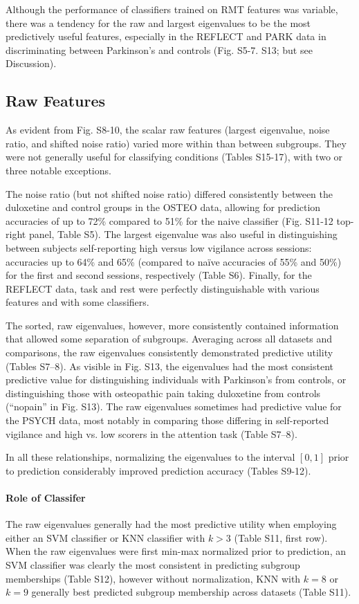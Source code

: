 \documentclass[NETN,manuscript]{stjour-new}
\begin{document}
Although the performance of classifiers trained on RMT features was variable, there was a tendency
for the raw and largest eigenvalues to be the most predictively useful features, especially in the
REFLECT and PARK data in discriminating between Parkinson's and controls (Fig. S5-7. S13; but see
Discussion).

\subsection{Raw Features}
As evident from Fig. S8-10, the scalar raw features (largest eigenvalue, noise ratio, and shifted
noise ratio) varied more within than between subgroups. They were not generally useful for
classifying conditions (Tables S15-17), with two or three notable exceptions.

The noise ratio (but not shifted noise ratio) differed consistently between the duloxetine and
control groups in the OSTEO data, allowing for prediction accuracies of up to 72\% compared to 51\%
for the naive classifier (Fig. S11-12 top-right panel, Table S5). The largest eigenvalue was also
useful in distinguishing between subjects self-reporting high versus low vigilance across sessions:
accuracies up to 64\% and 65\% (compared to naïve accuracies of 55\% and 50\%) for the first and
second sessions, respectively (Table S6). Finally, for the REFLECT data, task and rest were
perfectly distinguishable with various features and with some classifiers.

The sorted, raw eigenvalues, however, more consistently contained information that allowed some
separation of subgroups. Averaging across all datasets and comparisons, the raw eigenvalues
consistently demonstrated predictive utility (Tables S7--8). As visible in Fig. S13, the eigenvalues
had the most consistent predictive value for distinguishing individuals with Parkinson's from
controls, or distinguishing those with osteopathic pain taking duloxetine from controls (``nopain'' in
Fig. S13). The raw eigenvalues sometimes had predictive value for the PSYCH data, most notably in
comparing those differing in self-reported vigilance and high vs. low scorers in the attention task
(Table S7--8).

In all these relationships, normalizing the eigenvalues to the interval \([0,1]\) prior to
prediction considerably improved prediction accuracy (Tables S9-12).

\paragraph{Role of Classifer}
The raw eigenvalues generally had the most predictive utility when employing either an SVM
classifier or KNN classifier with \(k > 3\) (Table S11, first row). When the raw eigenvalues were
first min-max normalized prior to prediction, an SVM classifier was clearly the most consistent in
predicting subgroup memberships (Table S12), however without normalization, KNN with \(k = 8\) or
\(k = 9\) generally best predicted subgroup membership across datasets (Table S11).
\end{document}
